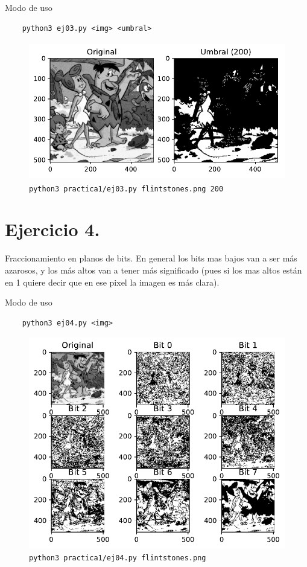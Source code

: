 \documentclass[11pt, spanish]{article}
\begin{document}
Modo de uso
\begin{verbatim}
    python3 ej03.py <img> <umbral>
\end{verbatim}

\begin{figure}[H]
\centering
  \includegraphics[height=6cm]{informe-imgs/ej03.pdf}
  \caption{\texttt{python3 practica1/ej03.py flintstones.png 200}}
\end{figure}


\section{Ejercicio 4.}
Fraccionamiento en planos de bits. En general los bits mas bajos van a ser más azarosos,
y los más altos van a tener más significado
(pues si los mas altos están en 1 quiere decir que en ese pixel la imagen es más clara).

Modo de uso
\begin{verbatim}
    python3 ej04.py <img>
\end{verbatim}

\begin{figure}[H]
\centering
  \includegraphics[width=1\textwidth]{informe-imgs/ej04.pdf}
  \caption{\texttt{python3 practica1/ej04.py flintstones.png}}
\end{figure}
\end{document}
